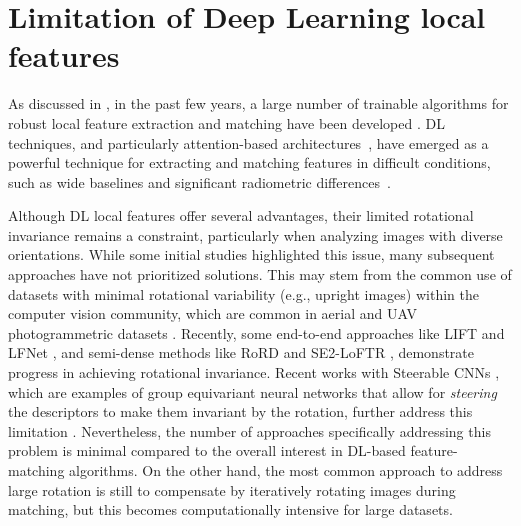 
\section{Limitation of Deep Learning local features}\label{sec:5:limitation_dl_feats}

As discussed in , in the past few years, a large number of trainable algorithms for robust local feature extraction and matching have been developed \citep{Yao_2021, remondino2022_at_with_dl}.
DL techniques, and particularly attention-based architectures~\citep{vaswani2023attention}, have emerged as a powerful technique for extracting and matching features in difficult conditions, such as wide baselines and significant radiometric differences~\citep{jin_image_2021, Yao_2021}.

Although DL local features offer several advantages, their limited rotational invariance remains a constraint, particularly when analyzing images with diverse orientations. 
While some initial studies highlighted this issue, many subsequent approaches have not prioritized solutions. 
This may stem from the common use of datasets with minimal rotational variability (e.g., upright images) within the computer vision community, which are common in aerial and UAV photogrammetric datasets \cite{Bkman2022_se2loftr}. 
Recently, some end-to-end approaches like LIFT \citep{yi2016lift} and LFNet \citep{ono2018lfnet}, and semi-dense methods like RoRD \citep{parihar2022rord} and SE2-LoFTR \citep{Bkman2022_se2loftr}, demonstrate progress in achieving rotational invariance. 
Recent works with Steerable CNNs \citep{cohen2016steerable, Wu2018_steerer}, which are examples of group equivariant neural networks that allow for \textit{steering} the descriptors to make them invariant by the rotation, further address this limitation \cite{Weiler2019_e2cnn, cesa2022_escnn, Bkman2022_se2loftr}.
Nevertheless, the number of approaches specifically addressing this problem is minimal compared to the overall interest in DL-based feature-matching algorithms.
On the other hand, the most common approach to address large rotation is still to compensate by iteratively rotating images during matching, but this becomes computationally intensive for large datasets.

